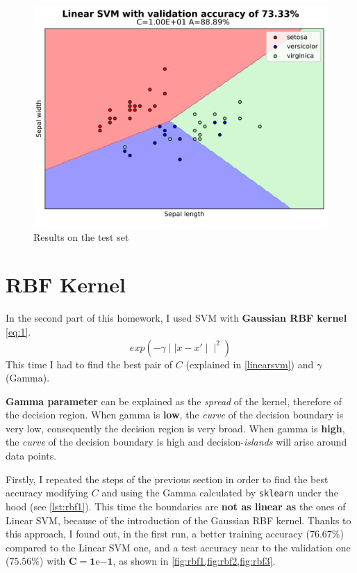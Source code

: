 \documentclass[a4paper, 11pt]{article}
\begin{document}
	\begin{figure}[ht!]
		\centering
		\includegraphics[width=0.7\paperwidth]{img/fig01c.png}
		\caption{Results on the test set}
		\label{fig:linear3}
	\end{figure}
		
	\section{RBF Kernel}
	
	In the second part of this homework, I used SVM with \textbf{Gaussian RBF kernel} \vref{eq:1}.
	\begin{equation} \label{eq:1}
	exp(-\gamma \mid\mid x-x' \mid\mid^2)
	\end{equation}
	This time I had to find the best pair of $C$ (explained in \vref{linearsvm})  and $\gamma$ (Gamma).
	
	\textbf{Gamma parameter} can be explained as the \textit{spread} of the kernel, therefore of the decision region. When gamma is \textbf{low}, the \textit{curve} of the decision boundary is very low, consequently the decision region is very broad. When gamma is \textbf{high}, the \textit{curve} of the decision boundary is high and decision-\textit{islands} will arise around data points.
	
	Firstly, I repeated the steps of the previous section in order to find the best accuracy modifying $C$ and using the Gamma calculated by \texttt{sklearn} under the hood (see \vref{lst:rbf1}).  This time the boundaries are \textbf{not as linear as} the ones of Linear SVM, because of the introduction of the Gaussian RBF kernel. Thanks to this approach, I found out, in the first run, a better training accuracy ($76.67\%$) compared to the Linear SVM one, and a test accuracy near to the validation one ($75.56\%$) with $\boldsymbol{C=1\mathrm{e}{-1}}$, as shown in \vref{fig:rbf1,fig:rbf2,fig:rbf3}.
	
\end{document}
